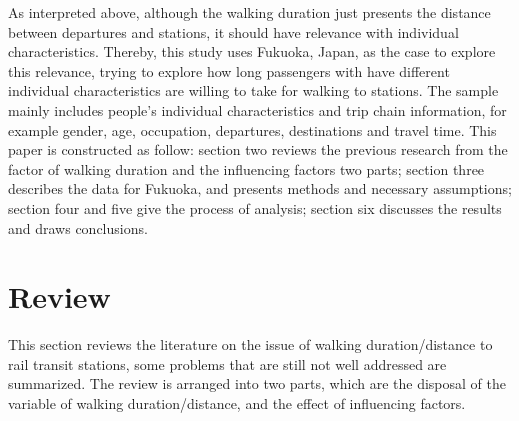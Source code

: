 %
As interpreted above, although the walking duration just presents the distance between departures and stations, it should have relevance with individual characteristics. Thereby, this study uses Fukuoka, Japan, as the case to explore this relevance, trying to explore how long passengers with have different individual characteristics are willing to take for walking to stations. The sample mainly includes people's individual characteristics and trip chain information, for example gender, age, occupation, departures, destinations and travel time. This paper is constructed as follow: section two reviews the previous research from the factor of walking duration and the influencing factors two parts;  section three describes the data for Fukuoka, and presents methods and necessary assumptions; section four and five give the process of analysis; section six discusses the results and draws conclusions. 

%
\section{Review}
This section reviews the literature on the issue of walking duration/distance to rail transit stations, some problems that are still not well addressed are summarized. The review is arranged into two parts, which are the disposal of the variable of walking duration/distance, and the effect of influencing factors.

